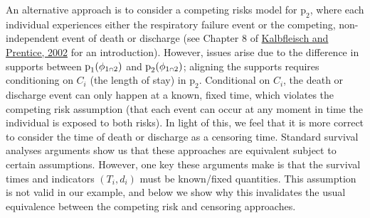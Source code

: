 \documentclass[
  10pt,
  a4paper,
]{article}
\let\Oldcap\cap
\renewcommand{\cap}{\mathrel{\mathsmaller{\Oldcap}}}
\newcommand{\pd}{\text{p}}
\begin{document}
An alternative approach is to consider a competing risks model for
\(\pd_{2}\), where each individual experiences either the respiratory
failure event or the competing, non-independent event of death or
discharge (see Chapter 8 of
\protect\hyperlink{ref-kalbfleisch_statistical_2002}{Kalbfleisch and
Prentice, 2002} for an introduction). However, issues arise due to the
difference in supports between \(\pd_{1}(\phi_{1 \cap 2})\) and
\(\pd_{2}(\phi_{1 \cap 2})\); aligning the supports requires
conditioning on \(C_{i}\) (the length of stay) in \(\pd_{2}\).
Conditional on \(C_{i}\), the death or discharge event can only happen
at a known, fixed time, which violates the competing risk assumption
(that each event can occur at any moment in time the individual is
exposed to both risks). In light of this, we feel that it is more
correct to consider the time of death or discharge as a censoring time.
Standard survival analyses arguments show us that these approaches are
equivalent subject to certain assumptions. However, one key these
arguments make is that the survival times and indicators
\((T_{i}, d_{i})\) must be known/fixed quantities. This assumption is
not valid in our example, and below we show why this invalidates the
usual equivalence between the competing risk and censoring approaches.
\end{document}
